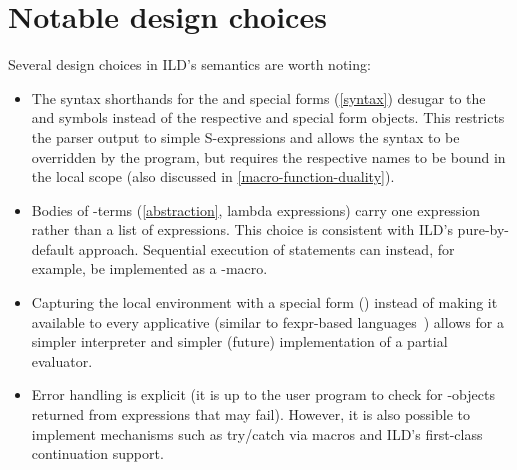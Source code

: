 \section{Notable design choices}
\label{design-choices}
Several design choices in ILD's semantics are worth noting:
\begin{itemize}
\item The syntax shorthands for the  and 
special forms (\cref{syntax}) desugar to the  and 
symbols instead of the respective  and  special form objects.
This restricts the parser output to simple S-expressions and allows the syntax to be
overridden by the program, but requires the respective names to be bound in the local
scope (also discussed in \cref{macro-function-duality}).
\item Bodies of \ildsetAbstr-terms (\cref{abstraction}, lambda expressions)
carry one expression rather than
a list of expressions. This choice is consistent with ILD's pure-by-default approach.
Sequential execution of statements can instead, for example, be implemented as a -macro.
\item Capturing the local environment with a special form () instead
of making it available to every applicative (similar to fexpr-based languages~\cite{kernel-report})
allows for a simpler interpreter and simpler (future) implementation of a partial evaluator.
\item Error handling is explicit (it is up to the user program to check for \ildfailbare-objects
returned from expressions that may fail). However, it is also possible to implement
mechanisms such as try/catch via macros and ILD's first-class continuation support.
\end{itemize}

